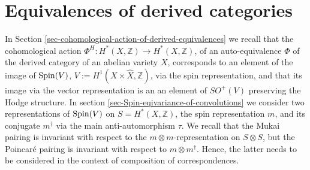 \documentclass[12pt]{amsart}
\numberwithin{equation}{subsection}
\theoremstyle{plain}
\theoremstyle{definition}
\newcommand{\ZZ}{{\mathbb Z}}
\newcommand{\Spin}{{\rm Spin}}
\begin{document}
% 
\section{Equivalences of derived categories}
\label{section-equivalences-of-derived-categories}

In Section \ref{sec-cohomological-action-of-derived-equivalences} we recall that the cohomological action $\Phi^H:H^*(X,\ZZ)\rightarrow H^*(X,\ZZ)$, 
of an auto-equivalence $\Phi$ of the derived category of an abelian variety $X$, corresponds to an element of the image of $\Spin(V)$, 
$V:=H^1(X\times\hat{X},\ZZ)$, via the spin representation, and that its image via the vector representation is
an an element of $SO^+(V)$ preserving the Hodge structure.
In section \ref{sec-Spin-eqivariance-of-convolutions} we consider two representations of $\Spin(V)$ on $S=H^*(X,\ZZ)$, the spin representation $m$, and its conjugate $m^\dagger$ via the main anti-automorphism $\tau$. We recall that the Mukai pairing is invariant with respect to the $m\otimes m$-representation on $S\otimes S$, but the Poincar\'{e} pairing is invariant with respect to $m\otimes m^\dagger.$ Hence, the latter needs to be considered in the context of composition of correspondences.


% 
\end{document}
